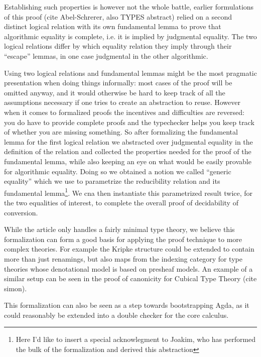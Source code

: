 \documentclass{book}
\begin{document}
Establishing such properties is however not the whole battle, earlier
formulations of this proof (cite Abel-Schrerer, also TYPES abstract)
relied on a second distinct logical relation with its own fundamental
lemma to prove that algorithmic equality is complete, i.e. it is
implied by judgmental equality. The two logical relations differ by
which equality relation they imply through their ``escape'' lemmas, in one
case judgmental in the other algorithmic.

Using two logical relations and fundamental lemmas might be the most
pragmatic presentation when doing things informally: most cases of the
proof will be omitted anyway, and it would otherwise be hard to keep
track of all the assumptions necessary if one tries to create an
abstraction to reuse. However when it comes to formalized proofs the
incentives and difficulties are reversed: you do have to provide
complete proofs and the typechecker helps you keep track of whether
you are missing something. So after formalizing the fundamental lemma
for the first logical relation we abstracted over judgmental equality
in the definition of the relation and collected the properties needed
for the proof of the fundamental lemma, while also keeping an eye on
what would be easily provable for algorithmic equality.  Doing so we
obtained a notion we called ``generic equality'' which we use to
parametrize the reducibility relation and its fundamental
lemma\footnote{Here I'd like to insert a special acknowlegment to
  Joakim, who has performed the bulk of the formalization and derived
  this abstraction}. We cna then instantiate this parametrized result
twice, for the two equalities of interest, to complete the overall
proof of decidability of conversion.


While the article only handles a fairly minimal type theory, we
believe this formalization can form a good basis for applying the
proof technique to more complex theories. For example the Kripke
structure could be extended to contain more than just renamings, but
also maps from the indexing category for type theories whose
denotational model is based on presheaf models. An example of a
similar setup can be seen in the proof of canonicity for Cubical Type
Theory (cite simon).

This formalization can also be seen as a step towards bootstrapping
Agda, as it could reasonably be extended into a double checker for the
core calculus.
\end{document}
